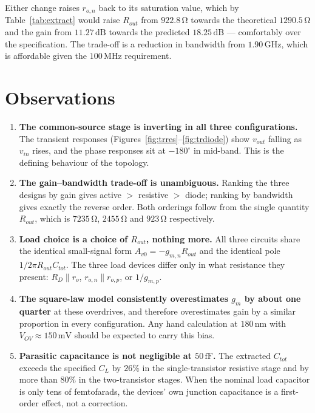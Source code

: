 \documentclass[12pt,a4paper]{article}
\newcommand{\U}[1]{\,\mathrm{#1}}
\newcommand{\dg}{^{\circ}}
\begin{document}
Either change raises $r_{o,n}$ back to its saturation value, which by
Table~\ref{tab:extract} would raise $R_{out}$ from $922.8\U{\Omega}$ towards
the theoretical $1290.5\U{\Omega}$ and the gain from $11.27\U{dB}$ towards the
predicted $18.25\U{dB}$ --- comfortably over the specification. The trade-off
is a reduction in bandwidth from $1.90\U{GHz}$, which is affordable given the
$100\U{MHz}$ requirement.

\section{Observations}
\begin{enumerate}[leftmargin=2.2em,itemsep=4pt]

\item \textbf{The common-source stage is inverting in all three
configurations.} The transient responses
(Figures~\ref{fig:trres}--\ref{fig:trdiode}) show $v_{out}$ falling as $v_{in}$
rises, and the phase responses sit at $-180\dg$ in mid-band. This is the
defining behaviour of the topology.

\item \textbf{The gain--bandwidth trade-off is unambiguous.} Ranking the three
designs by gain gives active $>$ resistive $>$ diode; ranking by bandwidth
gives exactly the reverse order. Both orderings follow from the single quantity
$R_{out}$, which is $7235\U{\Omega}$, $2455\U{\Omega}$ and $923\U{\Omega}$
respectively.

\item \textbf{Load choice is a choice of $R_{out}$, nothing more.} All three
circuits share the identical small-signal form $A_{v0}=-g_{m,n}R_{out}$ and the
identical pole $1/2\pi R_{out}C_{tot}$. The three load devices differ only in
what resistance they present: $R_D\parallel r_o$, $r_{o,n}\parallel r_{o,p}$,
or $1/g_{m,p}$.

\item \textbf{The square-law model consistently overestimates $g_m$ by about
one quarter} at these overdrives, and therefore overestimates gain by a similar
proportion in every configuration. Any hand calculation at $180\U{nm}$ with
$V_{OV}\approx 150\U{mV}$ should be expected to carry this bias.

\item \textbf{Parasitic capacitance is not negligible at $50\U{fF}$.} The
extracted $C_{tot}$ exceeds the specified $C_L$ by $26\%$ in the
single-transistor resistive stage and by more than $80\%$ in the two-transistor
stages. When the nominal load capacitor is only tens of femtofarads, the
devices' own junction capacitance is a first-order effect, not a correction.


\end{enumerate}
\end{document}
